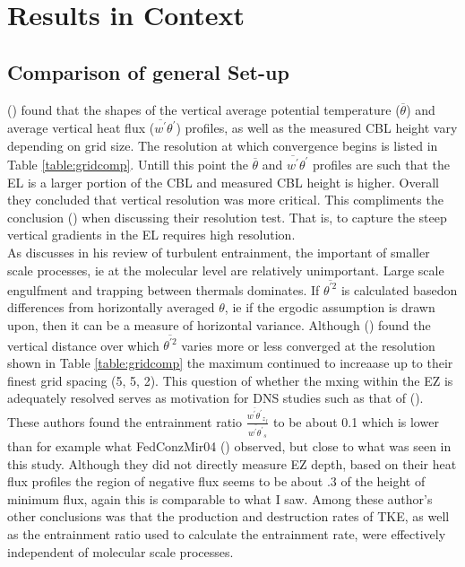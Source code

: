 
\chapter{Results in Context}
\label{ch:results}
\setlength{\parindent}{0cm}

\section{Comparison of general Set-up}
\FloatBarrier

\citeauthor{SullPat} (\citeyear{SullPat}) found that the shapes of the vertical average potential temperature ($\overline{\theta}$) and average vertical heat flux ($\overline{w^{'}}\theta^{'}$) profiles, as well as the measured \acs{CBL} height vary depending on grid size.  The resolution at which convergence begins is listed in Table \ref{table:gridcomp}.  Untill this point the $\overline{\theta}$ and $\overline{w^{'}}\theta^{'}$ profiles are such that the \acs{EL} is a larger portion of the \acs{CBL} and measured \acs{CBL} height is higher.  Overall they concluded that vertical resolution was more critical.  This compliments the conclusion \citeauthor{BrooksFowler2} (\citeyear{BrooksFowler2}) when discussing their resolution test.  That is, to capture the steep vertical gradients in the \acs{EL} requires high resolution. \\

As \citeauthor{Turner86} discusses in his \citeyear{Turner86} review of turbulent entrainment, the important of smaller scale processes, ie at the molecular level are relatively unimportant.  Large scale engulfment and trapping between thermals dominates.  If $\overline{\theta^{'2}}$ is calculated basedon differences from horizontally averaged $\theta$, ie if the ergodic assumption is drawn upon, then it can be a measure of horizontal variance. Although \citeauthor{SullPat} (\citeyear{SullPat}) found the vertical distance over which $\overline{\theta^{'2}}$ varies more or less converged at the resolution shown in Table \ref{table:gridcomp} the maximum continued to increaase up to their finest grid spacing (5, 5, 2).  This question of whether the mxing within the \acs{EZ} is adequately resolved serves as motivation for \acs{DNS}  studies such as that of \citeauthor{GarciaMellado} (\citeyear{GarciaMellado}). These authors found the entrainment ratio $\frac{\overline{w^{'}\theta^{'}}_{z_{f}}}{\overline{w^{'}\theta^{'}}_{s}}$ to be about 0.1 which is lower than for example what {FedConzMir04} (\citeyear{FedConzMir04}) observed, but close to what was seen in this study. Although they did not directly measure \acs{EZ} depth, based on their heat flux profiles the region of negative flux seems to be about .3 of the height of minimum flux, again this is comparable to what I saw.  Among these author's other conclusions was that the production and destruction rates of \acs{TKE}, as well as the entrainment ratio used to calculate the entrainment rate, were effectively independent of molecular scale processes.\\  
  

